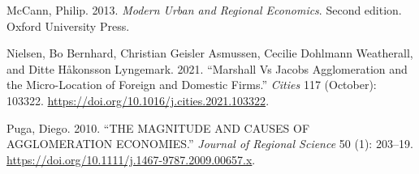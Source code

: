\documentclass[
  10,
  a4paper,
]{article}
\newlength{\cslhangindent}
\newlength{\cslentryspacingunit} %
\newenvironment{CSLReferences}[2] %
 {%
  \setlength{\parindent}{0pt}
  \ifodd #1
  \let\oldpar\par
  \def\par{\hangindent=\cslhangindent\oldpar}
  \fi
  \setlength{\parskip}{#2\cslentryspacingunit}
 }%
 {}
\begin{document}
\begin{CSLReferences}{1}{0}
\leavevmode{}%
McCann, Philip. 2013. \emph{Modern Urban and Regional Economics}. Second
edition. Oxford University Press.

\leavevmode{}%
Nielsen, Bo Bernhard, Christian Geisler Asmussen, Cecilie Dohlmann
Weatherall, and Ditte Håkonsson Lyngemark. 2021. {``Marshall Vs Jacobs
Agglomeration and the Micro-Location of Foreign and Domestic Firms.''}
\emph{Cities} 117 (October): 103322.
\url{https://doi.org/10.1016/j.cities.2021.103322}.

\leavevmode{}%
Puga, Diego. 2010. {``THE MAGNITUDE AND CAUSES OF AGGLOMERATION
ECONOMIES.''} \emph{Journal of Regional Science} 50 (1): 203--19.
\url{https://doi.org/10.1111/j.1467-9787.2009.00657.x}.

\end{CSLReferences}
\end{document}
